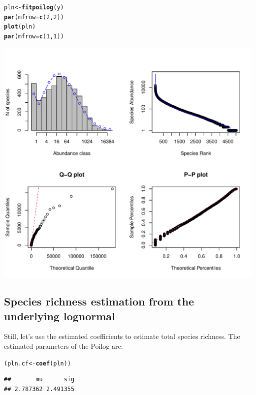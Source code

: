 \documentclass[12pt, A4]{article}\usepackage[]{graphicx}\usepackage[]{color}
\makeatletter
\def\maxwidth{ %
  \ifdim\Gin@nat@width>\linewidth
    \linewidth
  \else
    \Gin@nat@width
  \fi
}
\newcommand{\hlnum}[1]{\textcolor[rgb]{0.686,0.059,0.569}{#1}}%
\newcommand{\hlstd}[1]{\textcolor[rgb]{0.345,0.345,0.345}{#1}}%
\newcommand{\hlkwb}[1]{\textcolor[rgb]{0.69,0.353,0.396}{#1}}%
\newcommand{\hlkwc}[1]{\textcolor[rgb]{0.333,0.667,0.333}{#1}}%
\newcommand{\hlkwd}[1]{\textcolor[rgb]{0.737,0.353,0.396}{\textbf{#1}}}%
\newenvironment{kframe}{%
 \def\at@end@of@kframe{}%
 \ifinner\ifhmode%
  \def\at@end@of@kframe{\end{minipage}}%
  \begin{minipage}{\columnwidth}%
 \fi\fi%
 \def\FrameCommand##1{\hskip\@totalleftmargin \hskip-\fboxsep
 \colorbox{shadecolor}{##1}\hskip-\fboxsep
     \hskip-\linewidth \hskip-\@totalleftmargin \hskip\columnwidth}%
 \MakeFramed {\advance\hsize-\width
   \@totalleftmargin\z@ \linewidth\hsize
   \@setminipage}}%
 {\par\unskip\endMakeFramed%
 \at@end@of@kframe}
\newenvironment{knitrout}{}{} %
\makeatother
\begin{document}
\begin{knitrout}
\color{fgcolor}\begin{kframe}
\begin{alltt}
\hlstd{pln} \hlkwb{<-} \hlkwd{fitpoilog}\hlstd{(y)}
\hlkwd{par}\hlstd{(}\hlkwc{mfrow}\hlstd{=}\hlkwd{c}\hlstd{(}\hlnum{2}\hlstd{,}\hlnum{2}\hlstd{))}
\hlkwd{plot}\hlstd{(pln)}
\hlkwd{par}\hlstd{(}\hlkwc{mfrow}\hlstd{=}\hlkwd{c}\hlstd{(}\hlnum{1}\hlstd{,}\hlnum{1}\hlstd{))}
\end{alltt}
\end{kframe}

{\centering \includegraphics[width=\maxwidth]{figure/fit_pln-1} 

}



\end{knitrout}

\subsection*{Species richness estimation from the underlying lognormal}


Still, let's use the estimated coefficients to estimate total species richness.
The estimated parameters of the Poilog are:

\begin{knitrout}
\color{fgcolor}\begin{kframe}
\begin{alltt}
\hlstd{(pln.cf} \hlkwb{<-} \hlkwd{coef}\hlstd{(pln))}
\end{alltt}
\begin{verbatim}
##       mu      sig 
## 2.787362 2.491355
\end{verbatim}
\end{kframe}
\end{knitrout}
\end{document}
